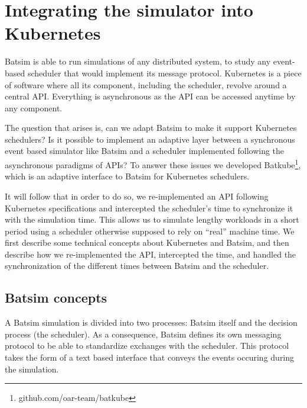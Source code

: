 \chapter{Integrating the simulator into Kubernetes}

Batsim is able to run simulations of any distributed system, to study any
event-based scheduler that would implement its message protocol. Kubernetes is
a piece of software where all its component, including the scheduler, revolve
around a central API. Everything is asynchronous as the API can be
accessed anytime by any component.

The question that arises is, can we adapt Batsim to make it support Kubernetes
schedulers? Is it possible to implement an adaptive layer between a synchronous
event based simulator like Batsim and a scheduler implemented following the
asynchronous paradigms of APIs? To answer these issues we developed
Batkube\footnote{github.com/oar-team/batkube}, which is an adaptive interface
to Batsim for Kubernetes schedulers.

It will follow that in order to do so, we re-implemented an API following
Kubernetes specifications and intercepted the scheduler's time to synchronize
it with the simulation time. This allows us to simulate lengthy workloads in a
short period using a scheduler otherwise supposed to rely on ``real'' machine
time. We first describe some technical concepts about Kubernetes and Batsim,
and then describe how we re-implemented the API, intercepted the time, and
handled the synchronization of the different times between Batsim and the
scheduler.

\section{Batsim concepts}

A Batsim simulation is divided into two processes: Batsim itself and the
decision process (the scheduler).  As a consequence, Batsim defines its own
messaging protocol to be able to standardize exchanges with the scheduler. This
protocol takes the form of a text based interface that conveys the events
occuring during the simulation.

